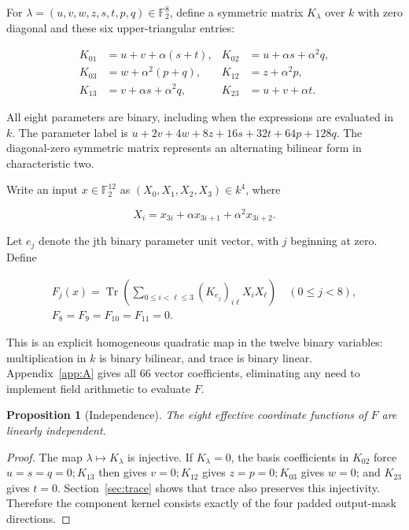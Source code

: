 \documentclass[11pt,a4paper]{article}
\newcommand{\F}{\mathbb F}
\DeclareMathOperator{\Tr}{Tr}
\newtheorem{proposition}[theorem]{Proposition}
\theoremstyle{definition}
\begin{document}
For $\lambda  = (u,v,w,z,s,t,p,q) \in  \F_{2}^{8}$, define a symmetric matrix $K_{\lambda }$ over $k$ with zero diagonal and these six upper-triangular entries:


\begin{equation}\label{eq:20}
\begin{aligned}K_{01}&=u+v+\alpha(s+t),& K_{02}&=u+\alpha s+\alpha^2q,\\K_{03}&=w+\alpha^2(p+q),&K_{12}&=z+\alpha^2p,\\K_{13}&=v+\alpha s+\alpha^2q,&K_{23}&=u+v+\alpha t.\end{aligned}
\end{equation}

All eight parameters are binary, including when the expressions are evaluated in $k$. The parameter label is $u+2v+4w+8z+16s+32t+64p+128q$. The diagonal-zero symmetric matrix represents an alternating bilinear form in characteristic two.


Write an input $x \in  \F_{2}^{12}$ as $(X_{0},X_{1},X_{2},X_{3}) \in  k^{4}$, where


\begin{equation}\label{eq:23}
X_i=x_{3i}+\alpha x_{3i+1}+\alpha^2x_{3i+2}.
\end{equation}

Let $e_{j}$ denote the jth binary parameter unit vector, with $j$ beginning at zero. Define


\begin{equation}\label{eq:25}
\begin{gathered} F_j(x)=\Tr\!\left(\sum_{0\le i<\ell\le3}(K_{e_j})_{i\ell}X_iX_\ell\right)\quad(0\le j<8),\\ F_8=F_9=F_{10}=F_{11}=0.\end{gathered}
\end{equation}

This is an explicit homogeneous quadratic map in the twelve binary variables: multiplication in $k$ is binary bilinear, and trace is binary linear. Appendix~\ref{app:A} gives all $66$ vector coefficients, eliminating any need to implement field arithmetic to evaluate $F$.


\begin{proposition}[Independence]\label{prop:independence}The eight effective coordinate functions of $F$ are linearly independent.\end{proposition}\begin{proof}

The map $\lambda  \mapsto  K_{\lambda }$ is injective. If $K_{\lambda } = 0$, the basis coefficients in $K_{02}$ force $u=s=q=0; K_{13}$ then gives $v=0; K_{12}$ gives $z=p=0; K_{03}$ gives $w=0$; and $K_{23}$ gives $t=0$. Section~\ref{sec:trace} shows that trace also preserves this injectivity. Therefore the component kernel consists exactly of the four padded output-mask directions.


\end{proof}
\end{document}
